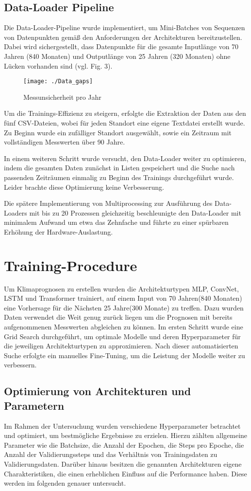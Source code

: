 \documentclass[acmtog, authorversion]{acmart} %
\begin{document}
\subsection{Data-Loader Pipeline} %
Die Data-Loader-Pipeline wurde implementiert, um Mini-Batches von Sequenzen von Datenpunkten gemäß den Anforderungen der Architekturen bereitzustellen. Dabei wird sichergestellt, dass Datenpunkte für die gesamte Inputlänge von 70 Jahren (840 Monaten) und Outputlänge von 25 Jahren (320 Monaten) ohne Lücken vorhanden sind (vgl. Fig. 3).
\begin{figure}[htp]
    \flushleft
    \texttt{[image: ./Data\_gaps]}
    \label{fig:sub3}
    \caption{Messunsicherheit pro Jahr}
\end{figure}
Um die Trainings-Effizienz zu steigern, erfolgte die Extraktion der Daten aus den fünf CSV-Dateien, wobei für jeden Standort eine eigene Textdatei erstellt wurde. Zu Beginn wurde ein zufälliger Standort ausgewählt, sowie ein Zeitraum mit vollständigen Messwerten über 90 Jahre.

In einem weiteren Schritt wurde versucht, den Data-Loader weiter zu optimieren, indem die gesamten Daten zunächst in Listen gespeichert und die Suche nach passenden Zeiträumen einmalig zu Beginn des Trainings durchgeführt wurde. Leider brachte diese Optimierung keine Verbesserung.

Die spätere Implementierung von Multiprocessing zur Ausführung des Data-Loaders mit bis zu 20 Prozessen gleichzeitig beschleunigte den Data-Loader mit minimalem Aufwand um etwa das Zehnfache und führte zu einer spürbaren Erhöhung der Hardware-Auslastung.
\section{Training-Procedure} 

Um Klimaprognosen zu erstellen wurden die Architekturtypen MLP, ConvNet, LSTM und Transformer trainiert, auf einem Input von 70 Jahren(840 Monaten) eine Vorhersage für die Nächsten 25 Jahre(300 Monate) zu treffen. Dazu wurden Daten verwendet die Weit genug zurück liegen um die Prognosen mit bereits aufgenommenen Messwerten abgleichen zu können.
Im ersten Schritt wurde eine Grid Search durchgeführt, um optimale Modelle und deren Hyperparameter für die jeweiligen Architekturtypen zu approximieren. Nach dieser automatisierten Suche erfolgte ein manuelles Fine-Tuning, um die Leistung der Modelle weiter zu verbessern. 

\subsection{Optimierung von Architekturen und Parametern}
Im Rahmen der Untersuchung wurden verschiedene Hyperparameter betrachtet und optimiert, um bestmögliche Ergebnisse zu erzielen. Hierzu zählten allgemeine Parameter wie die Batchsize, die Anzahl der Epochen, die Steps pro Epoche, die Anzahl der Validierungssteps und das Verhältnis von Trainingsdaten zu Validierungsdaten. Darüber hinaus besitzen die genannten Architekturen eigene Charakteristiken, die einen erheblichen Einfluss auf die Performance haben. Diese werden im folgenden genauer untersucht.
\end{document}
